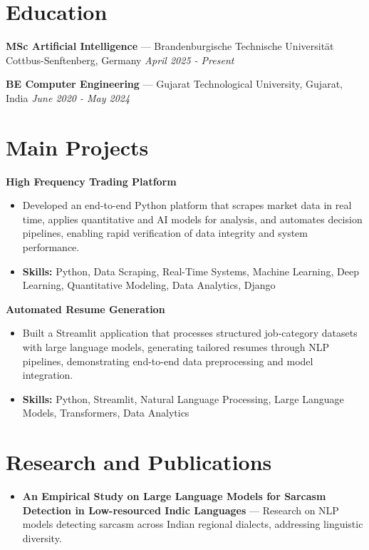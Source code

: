 \documentclass[a4paper,10pt]{article}
\begin{document}
\section*{Education}
\textbf{MSc Artificial Intelligence} — Brandenburgische Technische Universität Cottbus-Senftenberg, Germany \hfill \textit{April 2025 - Present}\par
\vspace{1.5pt}
\textbf{BE Computer Engineering} — Gujarat Technological University, Gujarat, India \hfill \textit{June 2020 - May 2024}\par

\section*{Main Projects}
\textbf{High Frequency Trading Platform}\par
\vspace{1pt}
\begin{itemize}
  \item Developed an end-to-end Python platform that scrapes market data in real time, applies quantitative and AI models for analysis, and automates decision pipelines, enabling rapid verification of data integrity and system performance.
  \item \textbf{Skills:} Python, Data Scraping, Real-Time Systems, Machine Learning, Deep Learning, Quantitative Modeling, Data Analytics, Django
\end{itemize}
\vspace{3pt}
\textbf{Automated Resume Generation}\par
\vspace{1pt}
\begin{itemize}
  \item Built a Streamlit application that processes structured job-category datasets with large language models, generating tailored resumes through NLP pipelines, demonstrating end-to-end data preprocessing and model integration.
  \item \textbf{Skills:} Python, Streamlit, Natural Language Processing, Large Language Models, Transformers, Data Analytics
\end{itemize}

\section*{Research and Publications}
\begin{itemize}
\item \textbf{An Empirical Study on Large Language Models for Sarcasm Detection in Low-resourced Indic Languages} — Research on NLP models detecting sarcasm across Indian regional dialects, addressing linguistic diversity.
\end{itemize}
\end{document}
